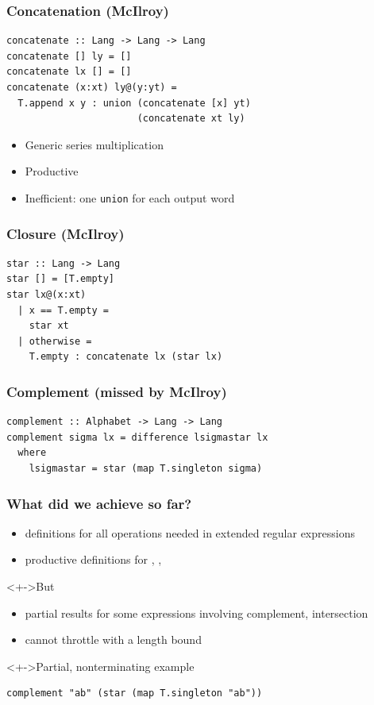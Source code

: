 \documentclass[pdftex,aspectratio=169]{beamer}
\begin{document}
\begin{frame}[fragile]
  \frametitle{Concatenation (McIlroy)}
\begin{lstlisting}[numbers=none]
concatenate :: Lang -> Lang -> Lang
concatenate [] ly = []
concatenate lx [] = []
concatenate (x:xt) ly@(y:yt) =
  T.append x y : union (concatenate [x] yt) 
                       (concatenate xt ly)
\end{lstlisting}
  \begin{itemize}
  \item Generic series multiplication
  \item Productive
  \item Inefficient: one \lstinline{union} for each output word
  \end{itemize}
\end{frame}

\begin{frame}
  \frametitle{Closure (McIlroy)}
\begin{lstlisting}[numbers=none]
star :: Lang -> Lang
star [] = [T.empty]
star lx@(x:xt)
  | x == T.empty =
    star xt
  | otherwise =
    T.empty : concatenate lx (star lx)
\end{lstlisting}
\end{frame}

\begin{frame}[fragile]
  \frametitle{Complement (missed by McIlroy)}
\begin{lstlisting}[numbers=none]
complement :: Alphabet -> Lang -> Lang
complement sigma lx = difference lsigmastar lx
  where
    lsigmastar = star (map T.singleton sigma)
\end{lstlisting}
\end{frame}

\begin{frame}[fragile]
  \frametitle{What did we achieve so far?}
  \begin{itemize}
  \item<+-> definitions for all operations needed in extended regular expressions
  \item<+-> productive definitions for , , 
  \end{itemize}
  \begin{block}<+->{But}
    \begin{itemize}
    \item partial results for some expressions involving complement, intersection
    \item cannot throttle with a length bound
    \end{itemize}
  \end{block}
  \begin{exampleblock}<+->{Partial, nonterminating example}
\begin{lstlisting}[numbers=none]
complement "ab" (star (map T.singleton "ab"))
\end{lstlisting}
  \end{exampleblock}
\end{frame}
\end{document}
